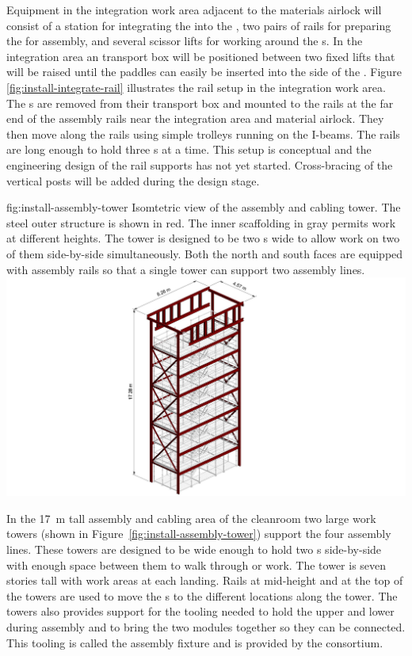 Equipment in the integration work area adjacent to the materials airlock will consist of a station for integrating the  into the , two pairs of rails for preparing the  for assembly, and several scissor lifts for working around the s. 
In the  integration area an  transport box will be positioned between two fixed lifts that will be raised until the  paddles can easily be inserted into the side of the . 
Figure \ref{fig:install-integrate-rail} illustrates the rail setup in the integration work area. 
The s are removed from their transport box and mounted to the rails at the far end of the assembly rails near the  integration area and material airlock. 
They then move along the rails using simple trolleys running on the I-beams. 
The rails are long enough to hold three s at a time. 
This setup is conceptual and the engineering design of the rail supports has not yet started. 
Cross-bracing of the vertical posts will be added during the design stage. 

\begin{dunefigure}{fig:install-assembly-tower}
  {
  Isomtetric view of the  assembly and cabling tower. The steel outer structure is shown in red. The inner scaffolding in gray permits work at different heights.
  The tower is designed to be two s wide to allow work on two of them side-by-side simultaneously. 
  Both the north and south faces are equipped with assembly rails so that 
   a single tower can support two assembly lines.
  }
\includegraphics[width=.5\textwidth]{graphics/install-assembly-tower.pdf}
\end{dunefigure}


In the \SI{17}{m} tall   assembly and cabling area of the cleanroom two large work towers (shown in Figure~\ref{fig:install-assembly-tower}) support the four assembly lines. 
These towers are designed to be wide enough to hold two s  side-by-side with enough space between them to walk through or work. 
The tower is seven stories tall with work areas at each landing.
Rails at mid-height and at the top of the towers are used to move the s to the different locations along the tower. 
The towers also provides support for the tooling needed to hold the upper and lower  during assembly and to bring the two modules together so they can be connected. This tooling is called the  assembly fixture and is provided by the  consortium. 

